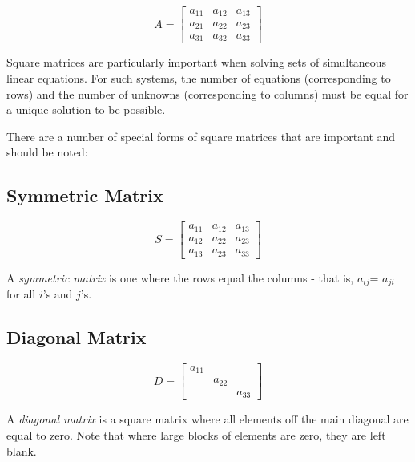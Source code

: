 \documentclass[book.tex]{subfiles}
\begin{document}
\begin{margintable}
	\[
	A=
	\begin{bmatrix}
	a_{11} & a_{12} & a_{13} \\
	a_{21} & a_{22} & a_{23} \\
	a_{31} & a_{32} & a_{33}
	\end{bmatrix}
	\]
\end{margintable}

Square matrices are particularly important when solving sets of simultaneous linear equations. For such systems, the number of equations (corresponding to rows) and the number of unknowns (corresponding to columns) must be equal for a unique solution to be possible.


There are a number of special forms of square matrices that are important and should
be noted:

\subsection{Symmetric Matrix}
\begin{margintable}
	\[
	S=
	\begin{bmatrix}
	a_{11} & a_{12} & a_{13} \\
	a_{12} & a_{22} & a_{23} \\
	a_{13} & a_{23} & a_{33}
	\end{bmatrix}
	\]
\end{margintable}
A \textit{symmetric matrix} is one where the rows equal the columns - that is, $a_{ij}$= $a_{ji}$ for all $i$'s and $j$'s.
\vspace{-13pt}

\subsection{Diagonal Matrix}
\begin{margintable}
	\[
	D=
	\begin{bmatrix}
	a_{11} &  &  \\
	& a_{22} &  \\
	&  & a_{33}
	\end{bmatrix}
	\]
\end{margintable}
A \textit{diagonal matrix} is a square matrix where all elements off the main diagonal are equal to zero. Note that where large blocks of elements are zero, they are left blank.
\end{document}
